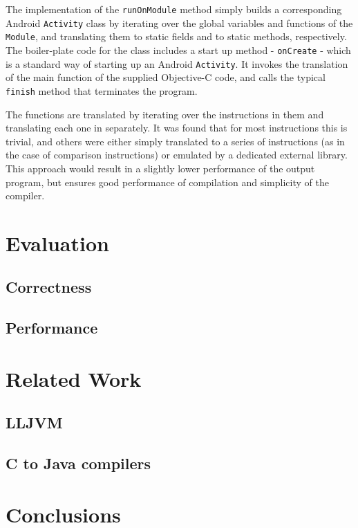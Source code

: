 \documentclass[parskip]{cs4rep}
\begin{document}
The implementation of the {\tt runOnModule} method simply builds a corresponding Android {\tt Activity} class by iterating over the global variables and functions of the {\tt Module}, and translating them to static fields and to static methods, respectively. The boiler-plate code for the class includes a start up method - {\tt onCreate} - which is a standard way of starting up an Android {\tt Activity}. It invokes the translation of the main function of the supplied Objective-C code, and calls the typical {\tt finish} method that terminates the program.

The functions are translated by iterating over the instructions in them and translating each one in separately. It was found that for most instructions this is trivial, and others were either simply translated to a series of instructions (as in the case of comparison instructions) or emulated by a dedicated external library. This approach would result in a slightly lower performance of the output program, but ensures good performance of compilation and simplicity of the compiler.

\chapter{Evaluation}

\section{Correctness}

\section{Performance}

\chapter{Related Work}

\section{LLJVM}

\section{C to Java compilers}

\chapter{Conclusions}



\end{document}
